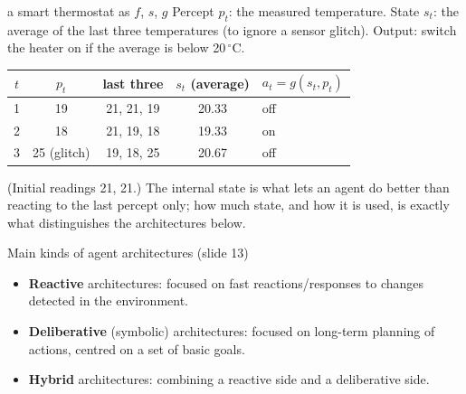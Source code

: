 \begin{nbexample}{a smart thermostat as $f$, $s$, $g$}
\notinslides
Percept $p_t$: the measured temperature. State $s_t$: the average of the last three
temperatures (to ignore a sensor glitch). Output: switch the heater on if the average is
below 20\,$^\circ$C.
\begin{center}
\small
\begin{tabular}{@{}c c c c l@{}}
\toprule
$t$ & $p_t$ & last three & $s_t$ (average) & $a_t = g(s_t, p_t)$ \\
\midrule
1 & 19 & 21, 21, 19 & 20.33 & off \\
2 & 18 & 21, 19, 18 & 19.33 & on \\
3 & 25 (glitch) & 19, 18, 25 & 20.67 & off \\
\bottomrule
\end{tabular}
\end{center}
(Initial readings 21, 21.) The internal state is what lets an agent do better than reacting
to the last percept only; how much state, and how it is used, is exactly what distinguishes
the architectures below.
\end{nbexample}

\begin{nbfact}{Main kinds of agent architectures (slide 13)}
\begin{itemize}[nosep]
  \item \textbf{Reactive} architectures: focused on fast reactions/responses to changes
        detected in the environment.
  \item \textbf{Deliberative} (symbolic) architectures: focused on long-term planning of
        actions, centred on a set of basic goals.
  \item \textbf{Hybrid} architectures: combining a reactive side and a deliberative side.
\end{itemize}
\end{nbfact}

